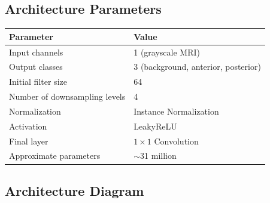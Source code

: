 \documentclass[12pt,a4paper]{report}
\begin{document}
\subsection{Architecture Parameters}

\begin{table}[H]
\centering
\begin{tabular}{ll}
\toprule
\textbf{Parameter} & \textbf{Value} \\
\midrule
Input channels & 1 (grayscale MRI) \\
Output classes & 3 (background, anterior, posterior) \\
Initial filter size & 64 \\
Number of downsampling levels & 4 \\
Normalization & Instance Normalization \\
Activation & LeakyReLU \\
Final layer & $1 \times 1$ Convolution \\
Approximate parameters & $\sim$31 million \\
\bottomrule
\end{tabular}
\end{table}

\subsection{Architecture Diagram}
\end{document}
